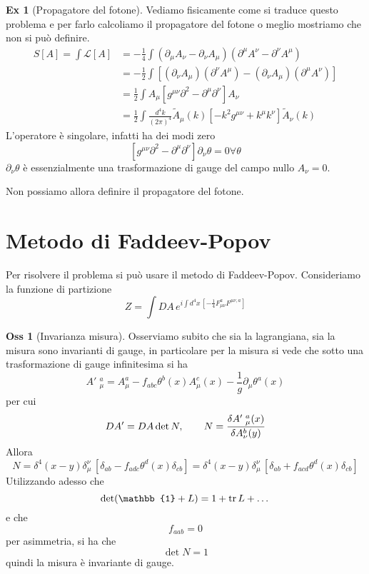 \documentclass[10pt,a4paper]{article}
\theoremstyle{definition}
\newtheorem{observation}{Oss}[section]
\newtheorem{example}{Ex}[section]
\newcommand{\lagr}{\mathcal{L}} %
\newcommand{\id}{\mathbb{1}}
\begin{document}
\begin{example}[Propagatore del fotone]
    Vediamo fisicamente come si traduce questo problema e per farlo calcoliamo il propagatore del fotone o meglio mostriamo che non si può definire.
    \begin{align*}
    S[A] = \int \lagr[A] &= -\frac14 \int (\partial_\mu A_\nu - \partial_\nu A_\mu)(\partial^\mu A^\nu - \partial^\nu A^\mu)      \\
    &= -\frac12 \int [(\partial_\nu A_\mu)(\partial^\nu A^\mu) - (\partial_\nu A_\mu)(\partial^\mu A^\nu)]   \\
    &= \frac12 \int A_\mu [g^{\mu \nu} \partial^2 - \partial^\mu \partial^\nu]A_\nu \\
    &= \frac12 \int \frac{d^4 k}{(2\pi)^4} \tilde{A}_\mu(k)[-k^2 g^{\mu\nu} + k^\mu k^\nu]\tilde{A}_\nu(k)
    \end{align*}
    L'operatore è singolare, infatti ha dei modi zero
    \[
        [g^{\mu \nu} \partial^2 - \partial^\mu \partial^\nu] \partial_\nu \theta = 0 \forall \theta
    \]
    $\partial_\nu\theta$ è essenzialmente una trasformazione di gauge del campo nullo $A_\nu = 0$.

    Non possiamo allora definire il propagatore del fotone.
\end{example}

\section{Metodo di Faddeev-Popov}
\label{section:FP}
    Per risolvere il problema si può usare il metodo di Faddeev-Popov. Consideriamo la funzione di partizione 
    \[
    Z = \int DA\,e^{i \int d^4x\, [-\frac14 F_{\mu\nu}^aF^{\mu\nu, a}]}    
    \]
\begin{observation}[Invarianza misura]
    Osserviamo subito che sia la lagrangiana, sia la misura sono invarianti di gauge, in particolare per la misura si vede che sotto una trasformazione di gauge infinitesima si ha
    \[
    A'\phantom{.}_\mu^a = A_\mu^a - f_{abc} \theta^b(x) A_\mu^c(x) - \frac{1}{g}\partial_\mu\theta^a(x)    
    \]
    per cui
    \[
    DA' = DA \det N , \qquad N = \fdv{A'\phantom{.}_\mu^a(x)}{A_\nu^b(y)}   
    \]
    Allora
    \[
    N = \delta^4(x - y) \delta_\mu^\nu\, [\delta_{ab} - f_{adc}\theta^d(x)\delta_{cb}] = \delta^4(x - y) \delta_\mu^\nu \, [\delta_{ab} + f_{acd}\theta^d(x)\delta_{cb}]    
    \]
    Utilizzando adesso che
    \[
    \det(\id + L) = 1 + \tr L + \dots    
    \]
    e che
    \[
    f_{aab} = 0    
    \]
    per asimmetria, si ha che
    \[
    \det N = 1    
    \]
    quindi la misura è invariante di gauge.
\end{observation}
\end{document}
